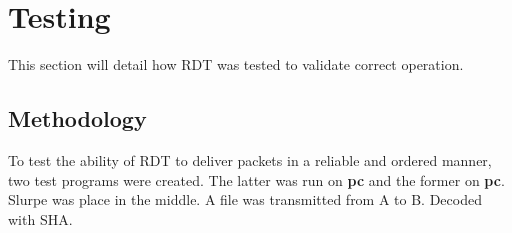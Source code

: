 \section{Testing}

This section will detail how RDT was tested to validate correct operation.

\subsection{Methodology}

To test the ability of RDT to deliver packets in a reliable and ordered manner, two test programs were created. The latter was run on \textbf{pc} and the former on \textbf{pc}. Slurpe was place in the middle. A file was transmitted from A to B. Decoded with SHA.
